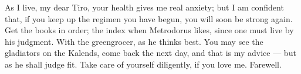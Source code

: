 

 As I live, my dear Tiro, your health gives me real anxiety; but I am confident that, if you keep up the regimen you have begun, you will soon be strong again. Get the books in order; the index when Metrodorus likes, since one must live by his judgment. With the greengrocer, as he thinks best. You may see the gladiators on the Kalends, come back the next day, and that is my advice --- but as he shall judge fit. Take care of yourself diligently, if you love me. Farewell.
